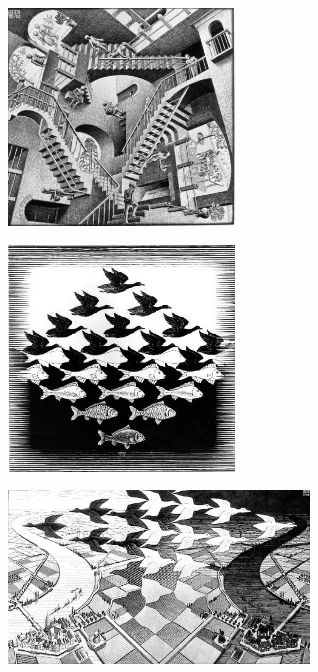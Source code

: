\begin{frame}
\begin{center}
\begin{minipage}{6cm}
\includegraphics[width=6cm]{figures/escher3.jpg}
\end{minipage}
\end{center}
\end{frame}

\begin{frame}
\begin{center}
\begin{minipage}{6cm}
\includegraphics[width=6cm]{figures/escher4.jpg}
\end{minipage}
\end{center}
\end{frame}

\begin{frame}
\begin{center}
\begin{minipage}{8cm}
\includegraphics[width=8cm]{figures/escher5.jpg}
\end{minipage}
\end{center}
\end{frame}


